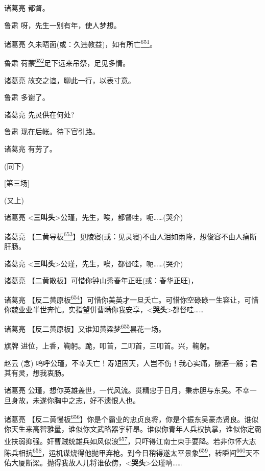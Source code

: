 诸葛亮 都督。

鲁肃 呀，先生一别有年，使人梦想。

诸葛亮
{久未晤面}(或：久违教益)，如有所亡\protect\hyperlink{fn651}{\textsuperscript{651}}。

鲁肃
荷蒙\protect\hyperlink{fn652}{\textsuperscript{652}}足下远来吊祭，足见多情。

诸葛亮 故交之谊，聊此一行，以表寸意。

鲁肃 多谢了。

诸葛亮 先灵供在何处?

鲁肃 现在后帐。待下官引路。

诸葛亮 有劳了。

(同下)

{[}第三场{]}

(又上)

诸葛亮
\textless{}\textbf{三叫头}\textgreater{}公瑾，先生，唉，都督哇，呃\ldots{}\ldots{}(哭介)

诸葛亮
【二黄导板\protect\hyperlink{fn653}{\textsuperscript{653}}】{见陵寝}(或：见灵寝)不由人泪如雨降，想俊容不由人痛断肝肠。

诸葛亮
\textless{}\textbf{三叫头}\textgreater{}公瑾，先生，唉，都督哇，呃\ldots{}\ldots{}(哭介)

诸葛亮 【二黄散板】可惜你钟山秀{春年正旺}(或：春华正旺)，

诸葛亮
【反二黄原板\protect\hyperlink{fn654}{\textsuperscript{654}}】可惜你美英才一旦夭亡。可惜你空碌碌一生容让，可惜你兢业业半世奔忙。实指望併曹瞒你我安享，\textless{}\textbf{哭头}\textgreater{}都督哇\ldots{}\ldots{}

诸葛亮
【反二黄原板】又谁知黄粱梦\protect\hyperlink{fn655}{\textsuperscript{655}}昙花一场。

旗牌 进位，上香，鞠躬。跪，叩首，二叩首，三叩首。兴，鞠躬。

赵云 (念)
呜呼公瑾，不幸夭亡！寿短固天，人岂不伤！我心实痛，酬酒一觞；君其有灵，想我衷肠。

诸葛亮
公瑾，想你英雄盖世，一代风流。贯精忠于日月，秉赤胆与东吴。不幸一旦身故，未遂你胸中之志，好不遗恨人也。

诸葛亮
【反二黄慢板\protect\hyperlink{fn656}{\textsuperscript{656}}】你是个霸业的忠贞良将，你是个振东吴豪杰贤良。谁似你天生来高智雅量，谁似你文武略器宇轩昂。谁似你青年人兵权执掌，谁似你定霸业扶弱抑强。奸曹贼统雄兵如风似浪\protect\hyperlink{fn657}{\textsuperscript{657}}，只吓得江南士束手要降。若非你怀大志陈兵相抗\protect\hyperlink{fn658}{\textsuperscript{658}}，运机谋烧得他抛甲弃枪。到今日稍得遂太平景象\protect\hyperlink{fn659}{\textsuperscript{659}}，转瞬间\protect\hyperlink{fn660}{\textsuperscript{660}}天不佑大厦断梁。抛得我故人儿将谁依傍，\textless{}\textbf{哭头}\textgreater{}公瑾呐\ldots{}\ldots{}

